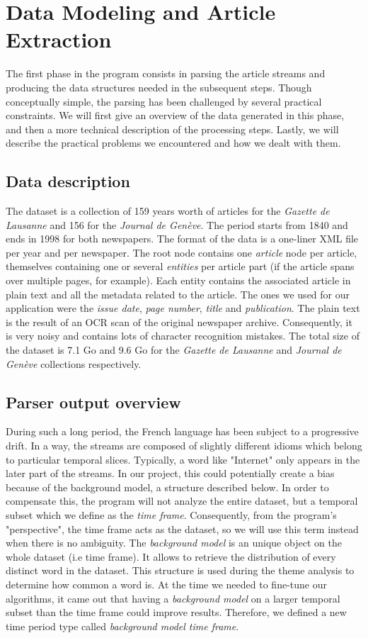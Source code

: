 \section{Data Modeling and Article Extraction}
The first phase in the program consists in parsing the article streams and producing the data structures needed in the subsequent steps. Though conceptually simple, the parsing has been challenged by several practical constraints. We will first give an overview of the data generated in this phase, and then a more technical description of the processing steps. Lastly, we will describe the practical problems we encountered and how we dealt with them.

\subsection{Data description}
The dataset is a collection of 159 years worth of articles for the \emph{Gazette de Lausanne} and 156 for the \emph{Journal de Genève}. The period starts from 1840 and ends in 1998 for both newspapers. The format of the data is a one-liner XML file per year and per newspaper. The root node contains one \textit{article} node per article, themselves containing one or several \textit{entities} per article part (if the article spans over multiple pages, for example). Each entity contains the associated article in plain text and all the metadata related to the article. The ones we used for our application were the \textit{issue date}, \textit{page number}, \textit{title} and \textit{publication}. The plain text is the result of an OCR scan of the original newspaper archive. Consequently, it is very noisy and contains lots of character recognition mistakes.
The total size of the dataset is 7.1 Go and 9.6 Go for the \emph{Gazette de Lausanne} and \emph{Journal de Genève} collections respectively.

\subsection{Parser output overview}
During such a long period, the French language has been subject to a progressive drift. In a way, the streams are composed of slightly different idioms which belong to particular temporal slices. Typically, a word like "Internet" only appears in the later part of the streams. In our project, this could potentially create a bias because of the background model, a structure described below. In order to compensate this, the program will not analyze the entire dataset, but a temporal subset which we define as the \emph{time frame}. Consequently, from the program's "perspective", the time frame acts as the dataset, so we will use this term instead when there is no ambiguity.
The \emph{background model} is an unique object on the whole dataset (i.e time frame). It allows to retrieve the distribution of every distinct word in the dataset. This structure is used during the theme analysis to determine how common a word is. At the time we needed to fine-tune our algorithms, it came out that having a \emph{background model} on a larger temporal subset than the time frame could improve results. Therefore, we defined a new time period type called  \emph{background model time frame}.

